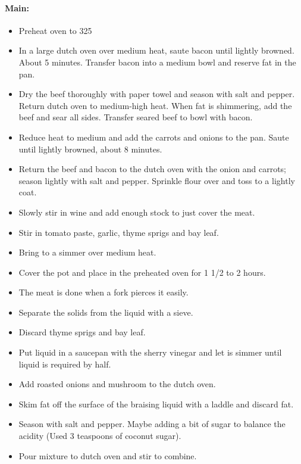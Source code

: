 \documentclass{article}
\begin{document}
\paragraph{Main:}
\begin{itemize}
\item Preheat oven to 325
\item In a large dutch oven over medium heat, saute bacon until lightly browned. About 5 minutes. Transfer bacon into a medium bowl and reserve fat in the pan.
\item Dry the beef thoroughly with paper towel and season with salt and pepper. Return dutch oven to medium-high heat. When fat is shimmering, add the beef and sear all sides. Transfer seared beef to bowl with bacon.
\item Reduce heat to medium and add the carrots and onions to the pan. Saute until lightly browned, about 8 minutes.
\item Return the beef and bacon to the dutch oven with the onion and carrots; season lightly with salt and pepper. Sprinkle flour over and toss to a lightly coat.
\item Slowly stir in wine and add enough stock to just cover the meat.
\item Stir in tomato paste, garlic, thyme sprigs and bay leaf.
\item Bring to a simmer over medium heat. 
\item Cover the pot and place in the preheated oven for 1 1/2 to 2 hours.
\item The meat is done when a fork pierces it easily.
\item Separate the solids from the liquid with a sieve. \item Discard thyme sprigs and bay leaf.
\item Put liquid in a saucepan with the sherry vinegar and let is simmer until liquid is required by half.
\item Add roasted onions and mushroom to the dutch oven.
\item Skim fat off the surface of the braising liquid with a laddle and discard fat.
\item Season with salt and pepper. Maybe adding a bit of sugar to balance the acidity (Used 3 teaspoons of coconut sugar).
\item Pour mixture to dutch oven and stir to combine.
\end{itemize}
\end{document}
